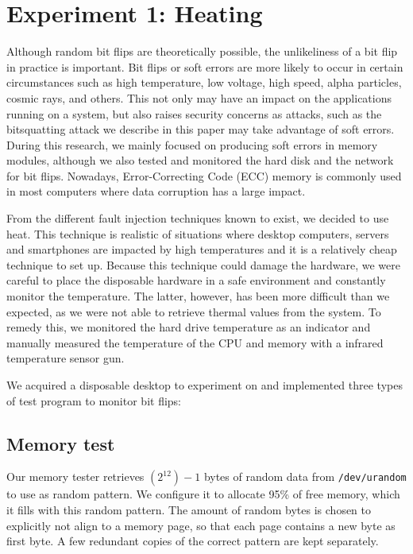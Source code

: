 \documentclass[conference]{IEEEtran}
\begin{document}
\section{Experiment 1: Heating}

Although random bit flips are theoretically possible, the unlikeliness of a bit
flip in practice is important. Bit flips or soft errors are more likely to
occur in certain circumstances such as high temperature, low voltage, high
speed, alpha particles, cosmic rays, and others. This not only may have an
impact on the applications running on a system, but also raises security
concerns as attacks, such as the bitsquatting attack we describe in this paper
may take advantage of soft errors. During this research, we mainly focused on
producing soft errors in memory modules, although we also tested and monitored
the hard disk and the network for bit flips. Nowadays, Error-Correcting Code
(ECC) memory is commonly used in most computers where data corruption has a
large impact.

From the different fault injection techniques known to
exist\cite{barenghi2012fault}, we decided to use heat. This technique is
realistic of situations where desktop computers, servers and smartphones are
impacted by high temperatures and it is a relatively cheap technique to set up.
Because this technique could damage the hardware, we were careful to place the
disposable hardware in a safe environment and constantly monitor the
temperature. The latter, however, has been more difficult than we expected, as
we were not able to retrieve thermal values from the system. To remedy this, we
monitored the hard drive temperature as an indicator and manually measured the
temperature of the CPU and memory with a infrared temperature sensor gun.

We acquired a disposable desktop to experiment on and implemented three types
of test program to monitor bit flips:

\subsection{Memory test}

Our memory tester retrieves $(2^{12})-1$ bytes of random data from
\texttt{/dev/urandom} to use as random pattern. We configure it to allocate
95\% of free memory, which it fills with this random pattern. The amount of
random bytes is chosen to explicitly not align to a memory page, so that each
page contains a new byte as first byte. A few redundant copies of the correct
pattern are kept separately.
\end{document}
